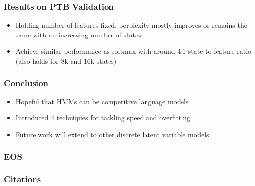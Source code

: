 \documentclass{beamer}
\begin{document}
\begin{frame}
\frametitle{Results on PTB Validation}
\centering
{}
\vspace{1em}
\begin{itemize}
    \item Holding number of features fixed, perplexity mostly improves
        or remains the same with an increasing number of states
    \item Achieve similar performance as softmax with around 4:1 state to feature ratio
        (also holds for 8k and 16k states)
\end{itemize}
\end{frame}

\begin{frame}
\frametitle{Conclusion}
\begin{itemize}
\item Hopeful that HMMs can be competitive language models
\vspace{2em}
\item Introduced 4 techniques for tackling speed and overfitting
\vspace{2em}
\item Future work will extend to other discrete latent variable models
\end{itemize}
\end{frame}

\begin{frame}
\frametitle{EOS}
\end{frame}


\begin{frame}
\frametitle{Citations}


\end{frame}
\end{document}
